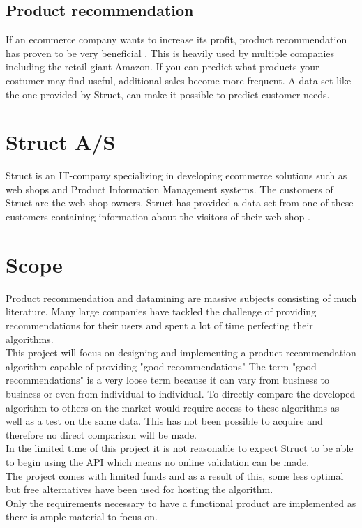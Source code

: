 \color{black}
\subsection{Product recommendation}
If an \gls{ecommerce} company wants to increase its profit, product recommendation has proven to be very beneficial \cite{BigCommerce}. This is heavily used by multiple companies including the retail giant Amazon\cite{Fortune}. If you can predict what products your costumer may find useful, additional sales become more frequent. A data set like the one provided by \gls{Struct}, can make it possible to predict customer needs.

\section{Struct A/S}
\gls{Struct} is an IT-company specializing in developing \gls{ecommerce} solutions such as web shops and Product Information Management systems. The customers of \gls{Struct} are the web shop owners. \gls{Struct} has provided a data set from one of these customers containing information about the visitors of their web shop \cite{Struct}.


\section{Scope}
Product recommendation and \gls{datamining} are massive subjects consisting of much literature. Many large companies have tackled the challenge of providing recommendations for their users and spent a lot of time perfecting their algorithms.\\
This project will focus on designing and implementing a product recommendation algorithm capable of providing "good recommendations" The term "good recommendations" is a very loose term because it can vary from business to business or even from individual to individual. To directly compare the developed algorithm to others on the market would require access to these algorithms as well as a test on the same data. This has not been possible to acquire and therefore no direct comparison will be made. \\
In the limited time of this project it is not reasonable to expect \gls{Struct} to be able to begin using the API which means no online validation can be made. \\
The project comes with limited funds and as a result of this, some less optimal but free alternatives have been used for hosting the algorithm. \\
Only the requirements necessary to have a functional product are implemented as there is ample material to focus on.
